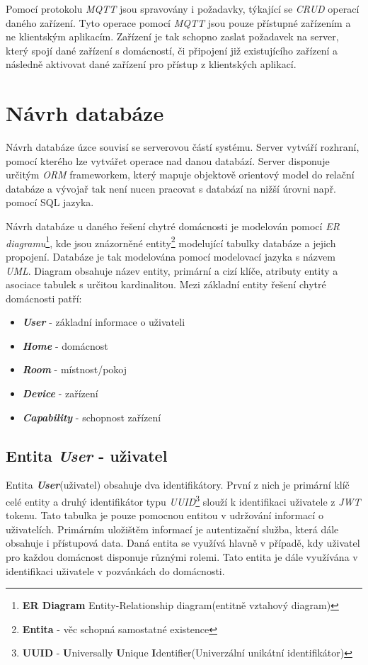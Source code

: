 Pomocí protokolu \emph{MQTT} jsou spravovány i požadavky, týkající se \emph{CRUD} operací daného zařízení. Tyto operace pomocí \emph{MQTT} jsou pouze přístupné zařízením a ne klientským aplikacím.
Zařízení je tak schopno zaslat požadavek na server, který spojí dané zařízení s domácností, či připojení již existujícího zařízení a následně aktivovat dané zařízení pro přístup z klientských aplikací.

\section{Návrh databáze}
\label{navrh:databaze}

Návrh databáze úzce souvisí se serverovou částí systému. Server vytváří rozhraní, pomocí kterého lze vytvářet operace nad danou databází.
Server disponuje určitým \emph{ORM} frameworkem, který mapuje objektově orientový model do relační databáze a vývojař tak není nucen pracovat s databází na nižší úrovni např. pomocí SQL jazyka.

Návrh databáze u daného řešení chytré domácnosti je modelován pomocí \emph{ER diagramu}\footnote{\textbf{ER Diagram} Entity-Relationship diagram(entitně vztahový diagram)}, kde jsou znázorněné entity\footnote{\textbf{Entita} - věc schopná samostatné existence} modelující tabulky databáze a jejich propojení.
Databáze je tak modelována pomocí modelovací jazyka s názvem \emph{UML}. Diagram obsahuje název entity, primární a cizí klíče, atributy entity a asociace tabulek s určitou kardinalitou.
\newpage
Mezi základní entity řešení chytré domácnosti patří:
\begin{itemize}
  \item \textbf{\emph{User}} - základní informace o uživateli
  \item \textbf{\emph{Home}} - domácnost
  \item \textbf{\emph{Room}} - místnost/pokoj
  \item \textbf{\emph{Device}} - zařízení
  \item \textbf{\emph{Capability}} - schopnost zařízení
\end{itemize}

\subsection*{Entita \emph{User} - uživatel}
\label{databaze:user}
Entita \textbf{\emph{User}}(uživatel) obsahuje dva identifikátory. První z nich je primární klíč celé entity a druhý identifikátor typu \emph{UUID}\footnote{\textbf{UUID} - \textbf{U}niversally \textbf{U}nique \textbf{I}dentifier(Univerzální unikátní identifikátor)} slouží k identifikaci uživatele z \emph{JWT} tokenu.
Tato tabulka je pouze pomocnou entitou v udržování informací o uživatelích. Primárním uložištěm informací je autentizační služba, která dále obsahuje i přístupová data.
Daná entita se využívá hlavně v případě, kdy uživatel pro každou domácnost disponuje různými rolemi. Tato entita je dále využívána v identifikaci uživatele v pozvánkách do domácnosti.

